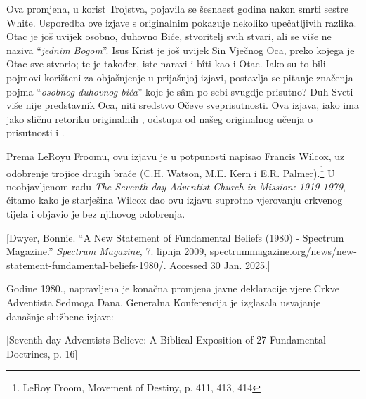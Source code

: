 Ova promjena, u korist Trojstva, pojavila se šesnaest godina nakon smrti sestre White. Usporedba ove izjave s originalnim  pokazuje nekoliko upečatljivih razlika. Otac je još uvijek osobno, duhovno Biće, stvoritelj svih stvari, ali se više ne naziva “\textit{jednim Bogom}”. Isus Krist je još uvijek Sin Vječnog Oca, preko kojega je Otac sve stvorio; te je također, iste naravi i bîti kao i Otac. Iako su to bili pojmovi korišteni za objašnjenje  u prijašnjoj izjavi, postavlja se pitanje značenja pojma “\textit{osobnog duhovnog bića}” koje je sâm po sebi svugdje prisutno? Duh Sveti više nije predstavnik Oca, niti sredstvo Očeve sveprisutnosti. Ova izjava, iako ima jako sličnu retoriku originalnih , odstupa od našeg originalnog učenja o prisutnosti i .

Prema LeRoyu Froomu, ovu izjavu je u potpunosti napisao Francis Wilcox, uz odobrenje trojice drugih braće (C.H. Watson, M.E. Kern i E.R. Palmer).\footnote{LeRoy Froom, Movement of Destiny, p. 411, 413, 414} U neobjavljenom radu \textit{The Seventh-day Adventist Church in Mission: 1919-1979}, čitamo kako je starješina Wilcox dao ovu izjavu suprotno vjerovanju crkvenog tijela i objavio je bez njihovog odobrenja.

[Dwyer, Bonnie. “A New Statement of Fundamental Beliefs (1980) - Spectrum Magazine.” \textit{Spectrum Magazine}, 7. lipnja 2009, \href{https://spectrummagazine.org/news/new-statement-fundamental-beliefs-1980/}{spectrummagazine.org/news/new-statement-fundamental-beliefs-1980/}. Accessed 30 Jan. 2025.]

Godine 1980., napravljena je konačna promjena javne deklaracije vjere Crkve Adventista Sedmoga Dana. Generalna Konferencija je izglasala usvajanje današnje službene izjave:

[Seventh-day Adventists Believe: A Biblical Exposition of 27 Fundamental Doctrines, p. 16]

